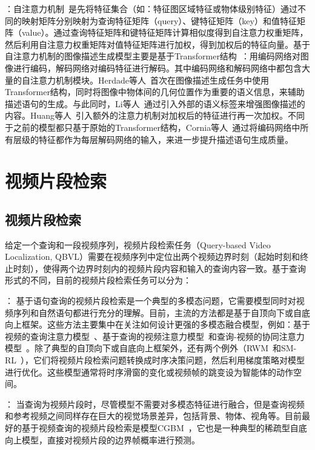 \textbf{}：自注意力机制~\cite{vaswani2017attention}是先将特征集合（如：特征图区域特征或物体级别特征）通过不同的映射矩阵分别映射为查询特征矩阵（query）、键特征矩阵（key）和值特征矩阵（value）。通过查询特征矩阵和键特征矩阵计算相似度得到自注意力权重矩阵，然后利用自注意力权重矩阵对值特征矩阵进行加权，得到加权后的特征向量。基于自注意力机制的图像描述生成模型主要是基于Transformer结构~\cite{vaswani2017attention}：用编码网络对图像进行编码，解码网络对编码特征进行解码。其中编码网络和解码网络中都包含大量的自注意力机制模块。Herdade等人~\cite{herdade2019image}首次在图像描述生成任务中使用Transformer结构，同时将图像中物体间的几何位置作为重要的语义信息，来辅助描述语句的生成。与此同时，Li等人~\cite{li2019entangled}通过引入外部的语义标签来增强图像描述的内容。Huang等人~\cite{huang2019attention}引入额外的注意力机制对加权后的特征进行再一次加权。不同于之前的模型都只基于原始的Transformer结构，Cornia等人~\cite{cornia2020m}通过将编码网络中所有层级的特征都作为每层解码网络的输入，来进一步提升描述语句生成质量。


\section{视频片段检索}

\subsection{视频片段检索}

给定一个查询和一段视频序列，视频片段检索任务（Query-based Video Localization, QBVL）需要在视频序列中定位出两个视频边界时刻（起始时刻和终止时刻），使得两个边界时刻内的视频片段内容和输入的查询内容一致。基于查询形式的不同，目前的视频片段检索任务可以分为：

\textbf{}：
基于语句查询的视频片段检索是一个典型的多模态问题，它需要模型同时对视频序列和自然语句都进行充分的理解。目前，主流的方法都是基于自顶向下或自底向上框架。这些方法主要集中在关注如何设计更强的多模态融合模型，例如：基于视频的查询注意力模型~\cite{liu2018attentive}、基于查询的视频注意力模型~\cite{liu2018cross}和查询-视频的协同注意力模型~\cite{chen2018temporally,chen2019localizing,yuan2019find}。除了典型的自顶向下或自底向上框架外，还有两个例外（RWM~\cite{he2019read}和SM-RL~\cite{wang2019language}），它们将视频片段检索问题转换成时序决策问题，然后利用梯度策略对模型进行优化。这些模型通常将时序滑窗的变化或视频帧的跳变设为智能体的动作空间。

\textbf{}：
当查询为视频片段时，尽管模型不需要对多模态特征进行融合，但是查询视频和参考视频之间同样存在巨大的视觉场景差异，包括背景、物体、视角等。目前最好的基于视频查询的视频片段检索是模型CGBM~\cite{feng2018video}，它也是一种典型的稀疏型自底向上模型，直接对视频片段的边界帧概率进行预测。


